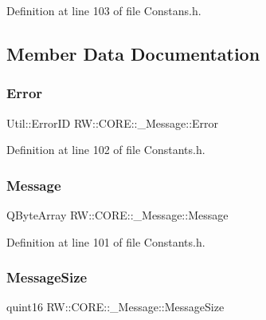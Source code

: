 Definition at line 103 of file Constans.\+h.



\subsection{Member Data Documentation}
\hypertarget{struct_r_w_1_1_c_o_r_e_1_1___message_ac01d35ce7dec7eab461377e395feb363}{}\label{struct_r_w_1_1_c_o_r_e_1_1___message_ac01d35ce7dec7eab461377e395feb363} 
\subsubsection{\texorpdfstring{Error}{Error}}
{\footnotesize\ttfamily Util\+::\+Error\+ID R\+W\+::\+C\+O\+R\+E\+::\+\_\+\+Message\+::\+Error}



Definition at line 102 of file Constants.\+h.

\hypertarget{struct_r_w_1_1_c_o_r_e_1_1___message_aa864261c124d4cdbdd582069e0fa7773}{}\label{struct_r_w_1_1_c_o_r_e_1_1___message_aa864261c124d4cdbdd582069e0fa7773} 
\subsubsection{\texorpdfstring{Message}{Message}}
{\footnotesize\ttfamily Q\+Byte\+Array R\+W\+::\+C\+O\+R\+E\+::\+\_\+\+Message\+::\+Message}



Definition at line 101 of file Constants.\+h.

\hypertarget{struct_r_w_1_1_c_o_r_e_1_1___message_a725845fb07a2a8052cdab2e29f1d5fb2}{}\label{struct_r_w_1_1_c_o_r_e_1_1___message_a725845fb07a2a8052cdab2e29f1d5fb2} 
\subsubsection{\texorpdfstring{Message\+Size}{MessageSize}}
{\footnotesize\ttfamily quint16 R\+W\+::\+C\+O\+R\+E\+::\+\_\+\+Message\+::\+Message\+Size}



